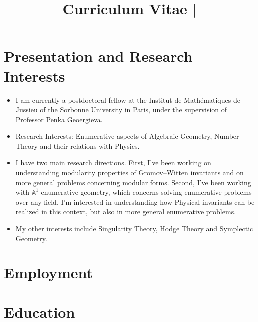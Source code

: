 \documentclass[10pt,a4paper,roman]{moderncv}        %
\title{Curriculum Vitae |}
\begin{document}
\makecvtitle

\section{Presentation and Research Interests}
    \begin{itemize}
        \item I am currently a postdoctoral fellow at the Institut de Mathématiques de Jussieu of the Sorbonne University in Paris, under the supervision of Professor Penka Geoergieva.
        
        \smallskip
    
    \item    Research Interests: Enumerative aspects of Algebraic Geometry, Number Theory and their relations with Physics.
    
\smallskip

    \item I have two main research directions. First, I've been working on understanding modularity properties of Gromov--Witten invariants and on more general problems concerning modular forms. Second, I've been working with $\mathbb A^1$-enumerative geometry, which concerns solving enumerative problems over any field. I'm interested in understanding how Physical invariants can be realized in this context, but also in more general enumerative problems.
    
\smallskip

    \item My other interests include Singularity Theory, Hodge Theory and Symplectic Geometry.
        
    \end{itemize}
    
 
    
    
    
     
\section{Employment}
\section{Education}
\end{document}
